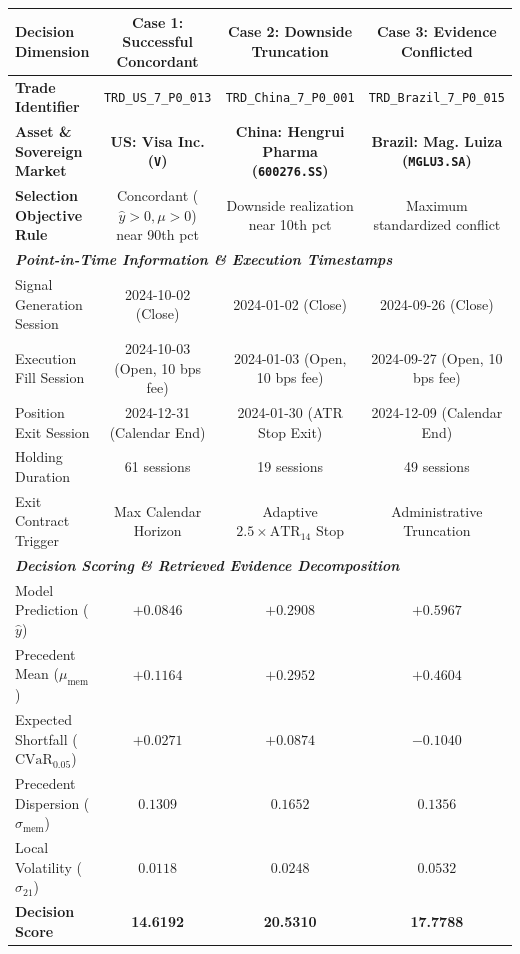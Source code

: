 \begin{table}[t]
\centering
\small
\begin{tabular}{lccc}
\toprule
\textbf{Decision Dimension} & \textbf{Case 1: Successful Concordant} & \textbf{Case 2: Downside Truncation} & \textbf{Case 3: Evidence Conflicted} \\
\midrule
\textbf{Trade Identifier} & \texttt{TRD\_US\_7\_P0\_013} & \texttt{TRD\_China\_7\_P0\_001} & \texttt{TRD\_Brazil\_7\_P0\_015} \\
\textbf{Asset \& Sovereign Market} & \textbf{US: Visa Inc. (\texttt{V})} & \textbf{China: Hengrui Pharma (\texttt{600276.SS})} & \textbf{Brazil: Mag. Luiza (\texttt{MGLU3.SA})} \\
\textbf{Selection Objective Rule} & Concordant ($\hat{y}>0, \mu>0$) near 90th pct & Downside realization near 10th pct & Maximum standardized conflict \\
\midrule
\multicolumn{4}{l}{\textit{\textbf{Point-in-Time Information \& Execution Timestamps}}} \\
\midrule
Signal Generation Session & 2024-10-02 (Close) & 2024-01-02 (Close) & 2024-09-26 (Close) \\
Execution Fill Session & 2024-10-03 (Open, 10 bps fee) & 2024-01-03 (Open, 10 bps fee) & 2024-09-27 (Open, 10 bps fee) \\
Position Exit Session & 2024-12-31 (Calendar End) & 2024-01-30 (ATR Stop Exit) & 2024-12-09 (Calendar End) \\
Holding Duration & 61 sessions & 19 sessions & 49 sessions \\
Exit Contract Trigger & Max Calendar Horizon & Adaptive $2.5\times\text{ATR}_{14}$ Stop & Administrative Truncation \\
\midrule
\multicolumn{4}{l}{\textit{\textbf{Decision Scoring \& Retrieved Evidence Decomposition}}} \\
\midrule
Model Prediction ($\hat{y}$) & $+0.0846$ & $+0.2908$ & $+0.5967$ \\
Precedent Mean ($\mu_{\text{mem}}$) & $+0.1164$ & $+0.2952$ & $+0.4604$ \\
Expected Shortfall ($\text{CVaR}_{0.05}$) & $+0.0271$ & $+0.0874$ & $-0.1040$ \\
Precedent Dispersion ($\sigma_{\text{mem}}$) & $0.1309$ & $0.1652$ & $0.1356$ \\
Local Volatility ($\sigma_{21}$) & $0.0118$ & $0.0248$ & $0.0532$ \\
\textbf{Decision Score} & \textbf{14.6192} & \textbf{20.5310} & \textbf{17.7788} \\

\end{tabular}
\end{table}
